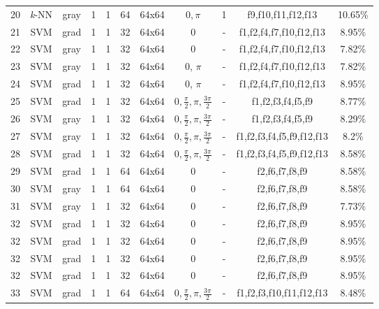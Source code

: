 \documentclass[times, utf8, zavrsni, numeric]{fer}
\begin{document}
\begin{adjustwidth}{-30pt}{0pt}
\begin{tabular}{c|c|c|c|c|c|c|c|c|c|c}
\end{tabular}
\end{adjustwidth}

\newpage

\begin{table}[ht]
\begin{adjustwidth}{-30pt}{0pt}
\begin{tabular}{c|c|c|c|c|c|c|c|c|c|c}
20 & \textit{k}-NN & gray & 1 & 1 & 64 & 64x64 & \(0, \pi\)& 1 & f9,f10,f11,f12,f13 & 10.65\% \\
21 & SVM & grad & 1 & 1 & 32 & 64x64 & 0 & - & f1,f2,f4,f7,f10,f12,f13 & 8.95\% \\
22 & SVM & gray & 1 & 1 & 32 & 64x64 & 0 & - & f1,f2,f4,f7,f10,f12,f13 & 7.82\% \\
23 & SVM & gray & 1 & 1 & 32 & 64x64 & 0, \(\pi\) & - & f1,f2,f4,f7,f10,f12,f13 & 7.82\% \\
24 & SVM & grad & 1 & 1 & 32 & 64x64 & 0, \(\pi\) & - & f1,f2,f4,f7,f10,f12,f13 & 8.95\% \\
25 & SVM & grad & 1 & 1 & 32 & 64x64 & \(0, \frac{\pi}{2}, \pi, \frac{3\pi}{2}\) & - & f1,f2,f3,f4,f5,f9 & 8.77\% \\
26 & SVM & gray & 1 & 1 & 32 & 64x64 & \(0, \frac{\pi}{2}, \pi, \frac{3\pi}{2}\) & - & f1,f2,f3,f4,f5,f9 & 8.29\% \\
27 & SVM & gray & 1 & 1 & 32 & 64x64 & \(0, \frac{\pi}{2}, \pi, \frac{3\pi}{2}\) & - & f1,f2,f3,f4,f5,f9,f12,f13 & 8.2\% \\
28 & SVM & grad & 1 & 1 & 32 & 64x64 & \(0, \frac{\pi}{2}, \pi, \frac{3\pi}{2}\) & - & f1,f2,f3,f4,f5,f9,f12,f13 & 8.58\% \\
29 & SVM & grad & 1 & 1 & 64 & 64x64 & 0 & - & f2,f6,f7,f8,f9 & 8.58\% \\
30 & SVM & gray & 1 & 1 & 64 & 64x64 & 0 & - & f2,f6,f7,f8,f9 & 8.58\% \\
31 & SVM & gray & 1 & 1 & 32 & 64x64 & 0 & - & f2,f6,f7,f8,f9 & 7.73\% \\
32 & SVM & grad & 1 & 1 & 32 & 64x64 & 0 & - & f2,f6,f7,f8,f9 & 8.95\% \\
32 & SVM & grad & 1 & 1 & 32 & 64x64 & 0 & - & f2,f6,f7,f8,f9 & 8.95\% \\
32 & SVM & grad & 1 & 1 & 32 & 64x64 & 0 & - & f2,f6,f7,f8,f9 & 8.95\% \\
32 & SVM & grad & 1 & 1 & 32 & 64x64 & 0 & - & f2,f6,f7,f8,f9 & 8.95\% \\
33 & SVM & grad & 1 & 1 & 64 & 64x64 & \(0, \frac{\pi}{2}, \pi, \frac{3\pi}{2}\) & - & f1,f2,f3,f10,f11,f12,f13 & 8.48\% \\

\end{tabular}
\end{adjustwidth}
\end{table}
\end{document}

